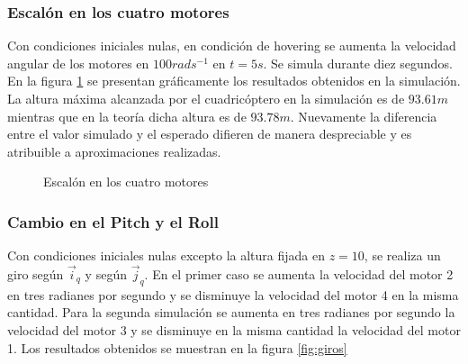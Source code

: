 \documentclass[main]{subfiles}
\begin{document}
\subsubsection{Escal\'on en los cuatro motores}
Con condiciones iniciales nulas, en condici\'on de hovering se aumenta la velocidad angular de los motores en $100 rads^{-1}$ en $t=5s$. Se simula durante diez segundos. En la figura \ref{fig:escalon} se presentan gr\'aficamente los resultados obtenidos en la simulaci\'on. La altura m\'axima alcanzada por el cuadric\'optero en la simulaci\'on es de $93.61m$ mientras que en la teor\'ia dicha altura es de $93.78m$. Nuevamente la diferencia entre el valor simulado y el esperado difieren de manera despreciable y es atribuible a aproximaciones realizadas.

\begin{figure} [h!]
  \centering
  \caption{Escal\'on en los cuatro motores}
  \label{fig:escalon}
\end{figure}

\subsubsection*{Cambio en el Pitch y el Roll}
Con condiciones iniciales nulas excepto la altura fijada en $z=10$, se realiza un giro seg\'un $\vec{i}_q$ y seg\'un $\vec{j}_q$. En el primer caso se aumenta la velocidad del motor 2 en tres radianes por segundo y se disminuye la velocidad del motor 4 en la misma cantidad. Para la segunda simulaci\'on se aumenta en tres radianes por segundo la velocidad del motor 3 y se disminuye en la misma cantidad la velocidad del motor 1. Los resultados obtenidos se muestran en la figura \ref{fig:giros}
\end{document}
